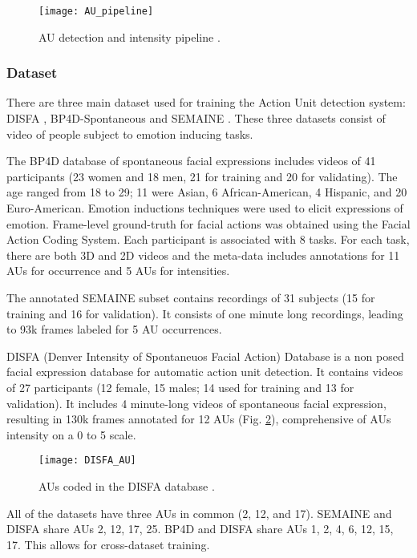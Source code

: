 \begin{figure}[H]
	\centering
	\texttt{[image: AU\_pipeline]}
	\caption{AU detection and intensity pipeline \cite{Baltru2015}.}
	\label{fig:AU_pipeline}
\end{figure}

\subsubsection{Dataset}
There are three main dataset used for training the Action Unit detection system:  DISFA \cite{DISFA}, BP4D-Spontaneous \cite{BP4D-Spontaneous} and SEMAINE \cite{SEMAINE}. These three datasets consist of video of people subject to emotion inducing tasks.

The BP4D database of spontaneous facial expressions includes videos of 41 participants (23 women and 18 men, 21 for training and 20 for validating). The age ranged from 18 to 29; 11 were Asian, 6 African-American, 4 Hispanic, and 20 Euro-American. Emotion inductions techniques were used to elicit expressions of emotion. Frame-level ground-truth for facial actions was obtained using the Facial Action Coding System. Each participant is associated with 8 tasks. For each task, there are both 3D and 2D videos and the meta-data includes annotations for 11 AUs for occurrence and 5 AUs for intensities.

The annotated SEMAINE subset contains recordings of 31 subjects (15 for training and 16 for validation). It consists of one minute long recordings, leading to 93k frames labeled for 5 AU occurrences.

DISFA (Denver Intensity of Spontaneuos Facial Action) Database is a non posed facial expression database for automatic action unit detection. It contains videos of 27 participants (12 female, 15 males; 14 used for training and 13 for validation). It includes 4 minute-long videos of spontaneous facial expression, resulting in 130k frames annotated for 12 AUs (Fig. \ref{fig:DISFA_AU}), comprehensive of AUs intensity on a 0 to 5 scale.

\begin{figure}[H]
	\centering
	\texttt{[image: DISFA\_AU]}
	\caption{AUs coded in the DISFA database \cite{DISFA_AU}.}
	\label{fig:DISFA_AU}
\end{figure}

All of the datasets have three AUs in common (2, 12, and 17). SEMAINE and DISFA share AUs 2, 12, 17, 25. BP4D and DISFA share AUs 1, 2, 4, 6, 12, 15, 17. This allows for cross-dataset training.

